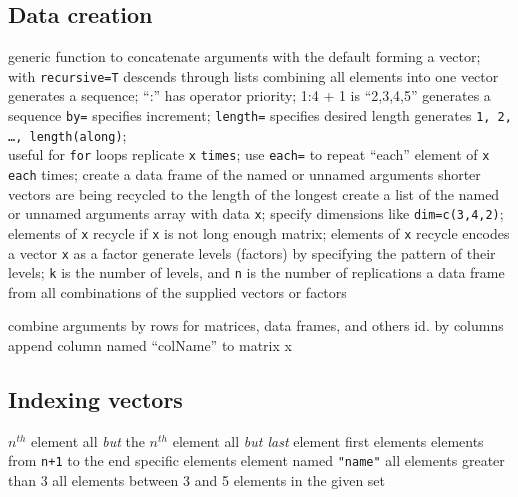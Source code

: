 \subsection{Data creation}{}
	{generic function to concatenate arguments with the default
forming a vector; with {\tt recursive=T} descends through lists combining all
elements into one vector}
	{generates a sequence; ``:'' has operator priority; 1:4 + 1 is
``2,3,4,5''}
	{generates a sequence {\tt by=} specifies increment; {\tt length=} specifies desired length}
	{generates {\tt 1, 2, \ldots, length(along)};\\useful for
{\tt for} loops}
	{replicate {\tt x} {\tt times}; use {\tt each=} to repeat ``each'' element of {\tt x} {\tt each} times;}
	{create a data frame of the named or unnamed arguments}
	{shorter vectors are being recycled to the length of the longest}
	{create a list of the named or unnamed arguments }
	{array with data {\tt x}; specify dimensions like {\tt dim=c(3,4,2)}; elements of {\tt x} recycle if {\tt x} is not long enough}
	{matrix; elements of {\tt x} recycle}
	{encodes a vector {\tt x} as a factor}
	{generate levels (factors) by specifying the pattern of their levels; {\tt k} is the number of levels, and {\tt n} is the number of replications}
	{a data frame from all combinations of the supplied vectors or factors}

	{combine arguments by rows for matrices, data frames, and
others}
	{id. by columns}
	{append column named ``colName'' to matrix x}

\subsection{Indexing vectors}{}
	{ $ n^{th} $ element}
	{all {\it but} the $ n^{th} $ element}
	{all {\it but last} element}
	{first elements}
	{elements from {\tt n+1} to the end}
	{specific elements}
	{element named {\tt "name"}}
	{all elements greater than 3}
	{all elements between 3 and 5}
	{elements in the given set}

